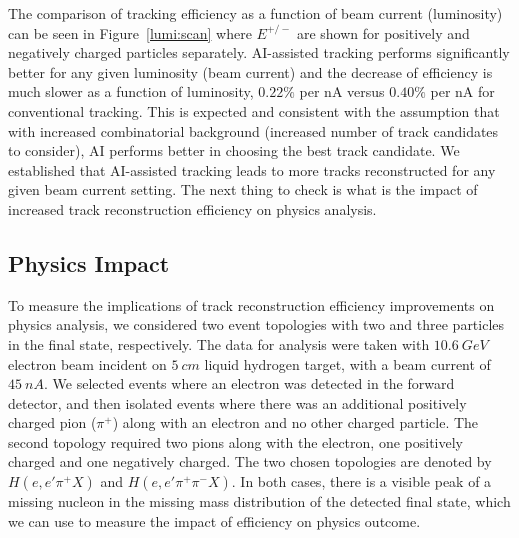 \documentclass[aps,prl,preprint,12pt]{elsarticle}
\begin{document}
The comparison of tracking efficiency as a function of beam current (luminosity) can be 
seen in Figure~\ref{lumi:scan} where $E^{+/-}$ are shown for positively and negatively charged 
particles separately. AI-assisted tracking performs significantly better for any given luminosity 
(beam current) and the decrease of efficiency is much slower as a function of luminosity, $0.22\%$ 
per nA versus $0.40\%$ per nA for conventional tracking. This is expected and consistent with the 
assumption that with increased combinatorial background (increased number of track candidates 
to consider), AI performs better in choosing the best track candidate. We established that AI-assisted
tracking leads to more tracks reconstructed for any given beam current setting. The next thing to 
check is what is the impact of increased track reconstruction efficiency on physics analysis.

\subsection{Physics Impact}

To measure the implications of track reconstruction efficiency improvements on physics analysis, 
we considered two event topologies with two and three particles in the final state, respectively. 
The data for analysis were taken with $10.6~GeV$ electron beam incident on $5~cm$ liquid 
hydrogen target, with a beam current of $45~nA$. 
We selected events where an electron was detected in the forward detector, and then isolated 
events where there was an additional positively charged pion ($\pi^+$) along with an electron 
and no other charged particle. The second topology required two pions along with the electron, 
one positively charged and one negatively charged. The two chosen topologies are denoted by 
$H(e,e'\pi^+X)$ and $H(e,e'\pi^+\pi^-X)$. In both cases, there is a visible peak of a missing nucleon
in the missing mass distribution of the detected final state, which we can use to measure the impact 
of efficiency on physics outcome. 
\end{document}
